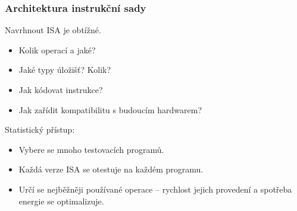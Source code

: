 \documentclass[aspectratio=169,11pt,svgnames]{beamer}
\begin{document}
\begin{frame}
 \frametitle{Architektura instrukční sady}
 Navrhnout ISA je obtížné.
 \begin{itemize}[label=\textbullet]
  \item Kolik operací a jaké?\pause
  \item Jaké typy úložišť? Kolik?\pause
  \item Jak kódovat instrukce?\pause
  \item Jak zařídit kompatibilitu s budoucím hardwarem?\pause
 \end{itemize}
 \alert{Statistický přístup:}
 \begin{itemize}[label=\textbullet]
  \item Vybere se mnoho testovacích programů.\pause
  \item Každá verze ISA se otestuje na každém programu.\pause
  \item Určí se nejběžněji používané operace -- rychlost jejich provedení a
   spotřeba energie se optimalizuje.
 \end{itemize}
\end{frame}
\end{document}
